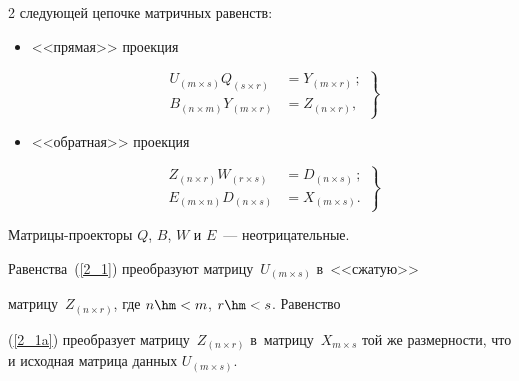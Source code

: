 \begin{multicols}{2}
следующей цепочке матричных равенств:


\begin{itemize}


  \item <<прямая>> проекция


\begin{equation}


\left.


\begin{array}{rl}


U_{(m \times s)} Q_{(s \times r)} &= Y_{(m \times r)}\,;\\[6pt]


B_{(n \times m)}  Y_{(m \times r)} &= Z_{(n \times r)},


\end{array}


\right\}


\label{2_1}


\end{equation}


  \item <<обратная>> проекция


\begin{equation}


\left.


\begin{array}{rl}


Z_{(n \times r)} W_{(r \times s)} &= D_{(n \times s)}\,;\\[6pt]


 E_{(m \times n)}  D_{(n \times s)}& = X_{(m \times s)}.


\end{array}


\right\}


\label{2_1a}


\end{equation}


\end{itemize}


Матрицы-проекторы $Q$, $B$, $W$ и $E$~--- неотрицательные.


Равенства~(\ref{2_1}) преобразуют матрицу~$U_{(m \times s)}$ в~<<сжатую>> 


матрицу~$Z_{(n \times r)}$, где $n \hm< m$, $r \hm< s$. Равенство 


(\ref{2_1a}) преобразует мат\-ри\-цу~$Z_{(n \times r)}$ в~мат\-ри\-цу~$X_{{m \times 


s}}$ той же размерности, что и исходная матрица данных $U_{(m \times s)}$.






\end{multicols}
